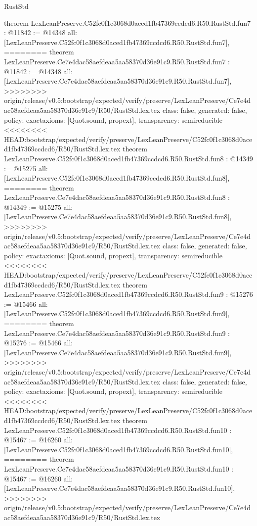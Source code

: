 \begin{lexlean}{RustStd}
\begin{coremodule}
{\begin{coremodule}
{{{{{{{{{theorem LexLeanPreserve.C52fc0f1c3068d0aced1fb47369ccdcd6.R50.RustStd.fun7 : @11842 := @14348 {
  all: [LexLeanPreserve.C52fc0f1c3068d0aced1fb47369ccdcd6.R50.RustStd.fun7],
========
theorem LexLeanPreserve.Ce7e4dac58aefdeaa5aa58370d36e91c9.R50.RustStd.fun7 : @11842 := @14348 {
  all: [LexLeanPreserve.Ce7e4dac58aefdeaa5aa58370d36e91c9.R50.RustStd.fun7],
>>>>>>>> origin/release/v0.5:bootstrap/expected/verify/preserve/LexLeanPreserve/Ce7e4dac58aefdeaa5aa58370d36e91c9/R50/RustStd.lex.tex
  class: false,
  generated: false,
  policy: exact{axioms: [Quot.sound, propext]},
  transparency: semireducible
}
<<<<<<<< HEAD:bootstrap/expected/verify/preserve/LexLeanPreserve/C52fc0f1c3068d0aced1fb47369ccdcd6/R50/RustStd.lex.tex
theorem LexLeanPreserve.C52fc0f1c3068d0aced1fb47369ccdcd6.R50.RustStd.fun8 : @14349 := @15275 {
  all: [LexLeanPreserve.C52fc0f1c3068d0aced1fb47369ccdcd6.R50.RustStd.fun8],
========
theorem LexLeanPreserve.Ce7e4dac58aefdeaa5aa58370d36e91c9.R50.RustStd.fun8 : @14349 := @15275 {
  all: [LexLeanPreserve.Ce7e4dac58aefdeaa5aa58370d36e91c9.R50.RustStd.fun8],
>>>>>>>> origin/release/v0.5:bootstrap/expected/verify/preserve/LexLeanPreserve/Ce7e4dac58aefdeaa5aa58370d36e91c9/R50/RustStd.lex.tex
  class: false,
  generated: false,
  policy: exact{axioms: [Quot.sound, propext]},
  transparency: semireducible
}
<<<<<<<< HEAD:bootstrap/expected/verify/preserve/LexLeanPreserve/C52fc0f1c3068d0aced1fb47369ccdcd6/R50/RustStd.lex.tex
theorem LexLeanPreserve.C52fc0f1c3068d0aced1fb47369ccdcd6.R50.RustStd.fun9 : @15276 := @15466 {
  all: [LexLeanPreserve.C52fc0f1c3068d0aced1fb47369ccdcd6.R50.RustStd.fun9],
========
theorem LexLeanPreserve.Ce7e4dac58aefdeaa5aa58370d36e91c9.R50.RustStd.fun9 : @15276 := @15466 {
  all: [LexLeanPreserve.Ce7e4dac58aefdeaa5aa58370d36e91c9.R50.RustStd.fun9],
>>>>>>>> origin/release/v0.5:bootstrap/expected/verify/preserve/LexLeanPreserve/Ce7e4dac58aefdeaa5aa58370d36e91c9/R50/RustStd.lex.tex
  class: false,
  generated: false,
  policy: exact{axioms: [Quot.sound, propext]},
  transparency: semireducible
}
<<<<<<<< HEAD:bootstrap/expected/verify/preserve/LexLeanPreserve/C52fc0f1c3068d0aced1fb47369ccdcd6/R50/RustStd.lex.tex
theorem LexLeanPreserve.C52fc0f1c3068d0aced1fb47369ccdcd6.R50.RustStd.fun10 : @15467 := @16260 {
  all: [LexLeanPreserve.C52fc0f1c3068d0aced1fb47369ccdcd6.R50.RustStd.fun10],
========
theorem LexLeanPreserve.Ce7e4dac58aefdeaa5aa58370d36e91c9.R50.RustStd.fun10 : @15467 := @16260 {
  all: [LexLeanPreserve.Ce7e4dac58aefdeaa5aa58370d36e91c9.R50.RustStd.fun10],
>>>>>>>> origin/release/v0.5:bootstrap/expected/verify/preserve/LexLeanPreserve/Ce7e4dac58aefdeaa5aa58370d36e91c9/R50/RustStd.lex.tex
}}}}}}}}}}}}}}
\end{coremodule}}
\end{coremodule}
\end{lexlean}
